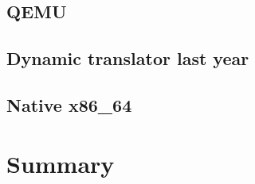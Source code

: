 \documentclass[course=eragp]{aspdoc}
\begin{document}
\subsection{QEMU}
\subsection{Dynamic translator last year}
\subsection{Native x86\_64}

\section{Summary}


{}
\end{document}

